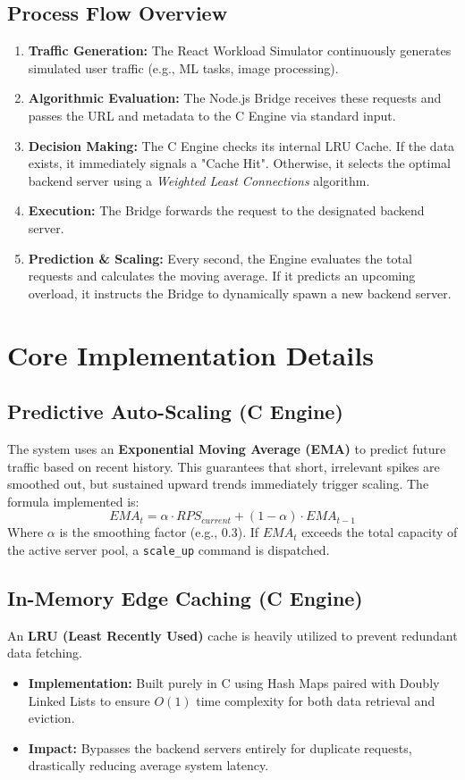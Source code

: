 \documentclass[12pt]{article}
\begin{document}
\subsection{Process Flow Overview}
\begin{enumerate}
    \item \textbf{Traffic Generation:} The React Workload Simulator continuously generates simulated user traffic (e.g., ML tasks, image processing).
    \item \textbf{Algorithmic Evaluation:} The Node.js Bridge receives these requests and passes the URL and metadata to the C Engine via standard input.
    \item \textbf{Decision Making:} The C Engine checks its internal LRU Cache. If the data exists, it immediately signals a "Cache Hit". Otherwise, it selects the optimal backend server using a \textit{Weighted Least Connections} algorithm.
    \item \textbf{Execution:} The Bridge forwards the request to the designated backend server.
    \item \textbf{Prediction \& Scaling:} Every second, the Engine evaluates the total requests and calculates the moving average. If it predicts an upcoming overload, it instructs the Bridge to dynamically spawn a new backend server.
\end{enumerate}

\section{Core Implementation Details}

\subsection{Predictive Auto-Scaling (C Engine)}
The system uses an \textbf{Exponential Moving Average (EMA)} to predict future traffic based on recent history. This guarantees that short, irrelevant spikes are smoothed out, but sustained upward trends immediately trigger scaling.
The formula implemented is:
\[ EMA_{t} = \alpha \cdot RPS_{current} + (1 - \alpha) \cdot EMA_{t-1} \]
Where \(\alpha\) is the smoothing factor (e.g., 0.3). If \(EMA_{t}\) exceeds the total capacity of the active server pool, a \texttt{scale\_up} command is dispatched.

\subsection{In-Memory Edge Caching (C Engine)}
An \textbf{LRU (Least Recently Used)} cache is heavily utilized to prevent redundant data fetching.
\begin{itemize}
    \item \textbf{Implementation:} Built purely in C using Hash Maps paired with Doubly Linked Lists to ensure $O(1)$ time complexity for both data retrieval and eviction.
    \item \textbf{Impact:} Bypasses the backend servers entirely for duplicate requests, drastically reducing average system latency.
\end{itemize}
\end{document}
